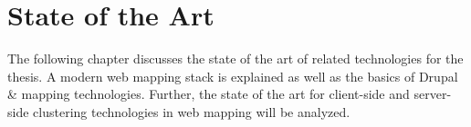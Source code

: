 
%
%

\chapter{State of the Art}
\label{chapter:state}

The following chapter discusses the state of the art of related technologies for the thesis. A modern web mapping stack is explained as well as the basics of Drupal \& mapping technologies. Further, the state of the art for client-side and server-side clustering technologies in web mapping will be analyzed.








